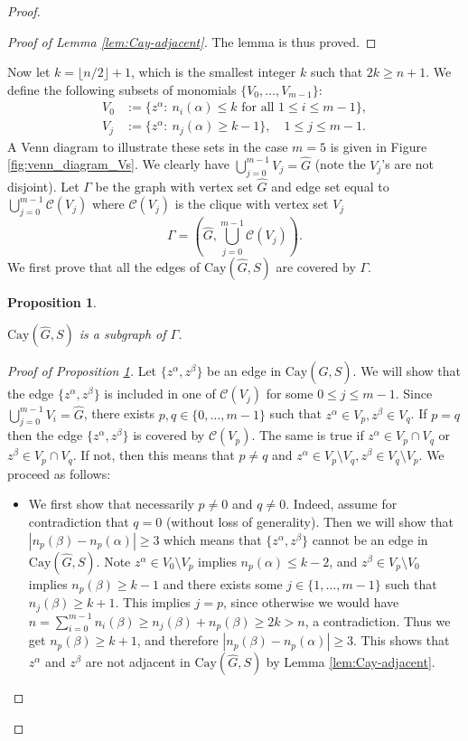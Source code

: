 \documentclass{article}
\newtheorem{proposition}{Proposition}
\theoremstyle{definition}
\begin{document}
\begin{proof}
\begin{proof}[Proof of Lemma \ref{lem:Cay-adjacent}]
    The lemma is thus proved. 
    \end{proof}



     Now let $k=\lfloor n/2\rfloor +1$, which is the smallest integer $k$ such that $2k\ge n+1$. We define the following subsets of monomials $\{V_0,\ldots,V_{m-1}\}$: 
\begin{equation}
\label{eq:defVj}
\begin{aligned}
V_0 &:=\{z^\alpha:~ n_i(\alpha)\le k\text{ for all }1\le i\le m-1\},\\
V_j&:=\{z^\alpha:~ n_j(\alpha)\ge k-1\},\quad 1\le j\le m-1.
\end{aligned}
\end{equation}
A Venn diagram to illustrate these sets in the case $m=5$ is given in Figure \ref{fig:venn_diagram_Vs}. We clearly have $\bigcup_{j=0}^{m-1} V_j = \hat{G}$ (note the $V_j$'s are not disjoint). Let $\Gamma$ be the graph with vertex set $\hat{G}$ and edge set equal to $\bigcup_{j=0}^{m-1} \mathcal{C}(V_j)$ where $\mathcal{C}(V_j)$ is the clique with vertex set $V_j$
\[
\Gamma = ( \hat{G} , \bigcup_{j=0}^{m-1} \mathcal{C}(V_j) ).
\]
We first prove that all the edges of $\text{Cay}(\hat{G},S)$ are covered by $\Gamma$.
\begin{proposition}\label{prop:cover}

$\text{Cay}(\hat{G},S)$ is a subgraph of $\Gamma$.
\end{proposition}
\begin{proof}[Proof of Proposition \ref{prop:cover}]
    Let $\{z^\alpha,z^\beta\}$ be an edge in $\text{Cay}(\hat{G},S)$. We will show that the edge $\{z^\alpha,z^\beta\}$ is included in one of $\mathcal{C}(V_j)$ for some $0\leq j\leq m-1$. Since $\bigcup_{j=0}^{m-1}V_i=\hat{G}$, there exists $p,q\in \{0,\ldots,m-1\}$ such that $z^\alpha\in V_p,z^\beta\in V_q$. If $p=q$ then the edge $\{z^\alpha,z^\beta\}$ is covered by $\mathcal{C}(V_p)$. The same is true if $z^\alpha \in V_p \cap V_q$ or $z^\beta \in V_p \cap V_q$. If not, then this means that $p \neq q$ and $z^\alpha\in V_p\setminus V_q,z^\beta\in V_q\setminus V_p$. We proceed as follows: 
    \begin{itemize}
        \item We first show that necessarily $p\neq 0$ and $q\neq 0$. Indeed, assume for contradiction that $q=0$ (without loss of generality). Then we will show that $|n_p(\beta) - n_p(\alpha)| \geq 3$ which means that $\{z^\alpha,z^\beta\}$ cannot be an edge in $\text{Cay}(\hat{G},S)$. Note $z^\alpha\in V_0\setminus V_p$ implies $n_p(\alpha)\le k-2$, and $z^\beta\in V_p\setminus V_0$ implies $n_p(\beta)\ge k-1$ and there exists some $j\in\{1,\ldots,m-1\}$ such that $n_j(\beta)\ge k+1$. This implies $j=p$, since otherwise we would have $n = \sum_{i=0}^{m-1} n_i(\beta) \ge n_j(\beta)+n_p(\beta)\ge 2k>n$, a contradiction. Thus we get $n_p(\beta)\ge k+1$, and therefore $|n_p(\beta)-n_p(\alpha)|\ge 3$. This shows that $z^\alpha$ and $z^\beta$ are not adjacent in $\text{Cay}(\hat{G},S)$ by Lemma \ref{lem:Cay-adjacent}. 
        

\end{itemize}
\end{proof}
\end{proof}
\end{document}
